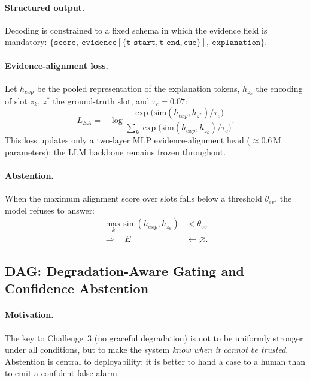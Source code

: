 \paragraph{Structured output.} Decoding is constrained to a fixed schema in which the evidence field is mandatory: $\{\texttt{score},\ \texttt{evidence}[\{\texttt{t\_start},\texttt{t\_end},\texttt{cue}\}],\ \texttt{explanation}\}$.

\paragraph{Evidence-alignment loss.} Let $h_{exp}$ be the pooled representation of the explanation tokens, $h_{z_k}$ the encoding of slot $z_k$, $z^{*}$ the ground-truth slot, and $\tau_c{=}0.07$:
\begin{equation}
L_{EA} = -\log \frac{\exp\!\big(\mathrm{sim}(h_{exp}, h_{z^{*}})/\tau_c\big)}{\sum_{k} \exp\!\big(\mathrm{sim}(h_{exp}, h_{z_k})/\tau_c\big)}.
\end{equation}
This loss updates only a two-layer MLP evidence-alignment head ($\approx 0.6$\,M parameters); the LLM backbone remains frozen throughout.

\paragraph{Abstention.} When the maximum alignment score over slots falls below a threshold $\theta_{ev}$, the model refuses to answer:
\begin{align}
\max_k \mathrm{sim}(h_{exp}, h_{z_k}) &< \theta_{ev} \nonumber\\
\Longrightarrow\quad E &\leftarrow \varnothing.
\end{align}

\subsection{DAG: Degradation-Aware Gating and Confidence Abstention}

\paragraph{Motivation.} The key to Challenge~3 (no graceful degradation) is not to be uniformly stronger under all conditions, but to make the system \emph{know when it cannot be trusted}. Abstention is central to deployability: it is better to hand a case to a human than to emit a confident false alarm.

